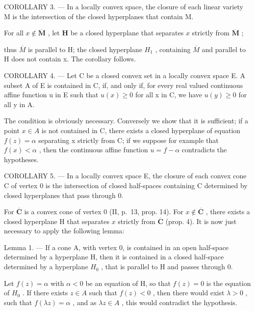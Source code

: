 COROLLARY 3. --- In a locally convex space, the closure of each linear variety M is the intersection of the closed hyperplanes that contain M.

For all \(x \notin \overline{\mathbf{M}}\) , let \(\mathbf{H}\) be a closed hyperplane that separates \(x\) strictly from \(\overline{\mathbf{M}}\) ;

thus \(\overline{M}\) is parallel to H; the closed hyperplane \(H_{1}\) , containing \(\overline{M}\) and parallel to H does not contain x. The corollary follows.

COROLLARY 4. --- Let C be a closed convex set in a locally convex space E. A subset A of E is contained in C, if, and only if, for every real valued continuous affine function u in E such that \(u(x) \geqslant 0\) for all x in C, we have \(u(y) \geqslant 0\) for all y in A.

The condition is obviously necessary. Conversely we show that it is sufficient; if a point \(x \in A\) is not contained in C, there exists a closed hyperplane of equation \(f(z) = \alpha\) separating x strictly from C; if we suppose for example that \(f(x) < \alpha\) , then the continuous affine function \(u = f - \alpha\) contradicts the hypotheses.

COROLLARY 5. --- In a locally convex space E, the closure of each convex cone C of vertex 0 is the intersection of closed half-spaces containing C determined by closed hyperplanes that pass through 0.

For \(\overline{\mathbf{C}}\) is a convex cone of vertex 0 (II, p.~13, prop. 14). For \(x \notin \overline{\mathbf{C}}\) , there exists a closed hyperplane H that separates \(x\) strictly from \(\overline{\mathbf{C}}\) (prop. 4). It is now just necessary to apply the following lemma:

Lemma 1. --- If a cone A, with vertex 0, is contained in an open half-space determined by a hyperplane H, then it is contained in a closed half-space determined by a hyperplane \(H_{0}\) , that is parallel to H and passes through 0.

Let \(f(z) = \alpha\) with \(\alpha < 0\) be an equation of H, so that \(f(z) = 0\) is the equation of \(H_0\) . If there exists \(z \in A\) such that \(f(z) < 0\) , then there would exist \(\lambda > 0\) , such that \(f(\lambda z) = \alpha\) , and as \(\lambda z \in A\) , this would contradict the hypothesis.

